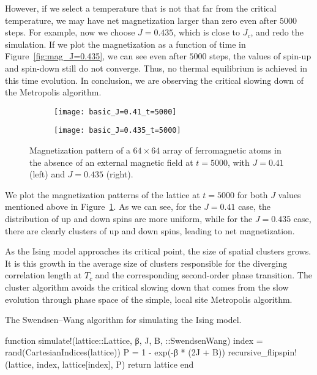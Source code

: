 However, if we select a temperature that is not that far from the critical temperature,
we may have net magnetization larger than zero even after \(5000\) steps.
For example, now we choose \(J = 0.435\), which is close to \(J_c\), and redo the
simulation.
If we plot the magnetization as a function of time in Figure~\ref{fig:mag_J=0.435},
we can see even after \(5000\) steps, the values of spin-up and spin-down still do
not converge. Thus, no thermal equilibrium is achieved in this time evolution.
In conclusion, we are observing the critical slowing down of the 
Metropolis algorithm.

\begin{figure}[hbt]
    \centering
    \begin{subfigure}{0.49\textwidth}
        \centering
        \texttt{[image: basic\_J=0.41\_t=5000]}
    \end{subfigure}
    \hfill
    \begin{subfigure}{0.49\textwidth}
        \centering
        \texttt{[image: basic\_J=0.435\_t=5000]}
    \end{subfigure}
    \caption{Magnetization pattern of a \(64 \times 64\) array of ferromagnetic atoms in the
        absence of an external magnetic field at \(t = 5000\), with \(J = 0.41\) (left) and
        \(J = 0.435\) (right).}
    \label{fig:t_5000}
\end{figure}

We plot the magnetization patterns of the lattice at \(t = 5000\) for both \(J\) values
mentioned above in Figure~\ref{fig:t_5000}. As we can see, for the \(J = 0.41\) case, the
distribution of up and down spins are more uniform, while for the \(J = 0.435\) case, there
are clearly clusters of up and down spins, leading to net magnetization.

As the Ising model approaches its critical point, the size of spatial clusters grows. It is
this growth in the average size of clusters responsible for the diverging correlation
length at \(T_c\) and the corresponding second-order phase transition. The cluster algorithm
avoids the critical slowing down that comes from the slow evolution through phase space of
the simple, local site Metropolis algorithm.

\begin{algorithm}
    \caption{The Swendsen--Wang algorithm for simulating the Ising model.}
    \label{lst:cluster}
    \begin{juliacode}
        function simulate!(lattice::Lattice, β, J, B, ::SwendsenWang)
            index = rand(CartesianIndices(lattice))
            P = 1 - exp(-β * (2J + B))
            recursive_flipspin!(lattice, index, lattice[index], P)
            return lattice
        end
    \end{juliacode}
\end{algorithm}

